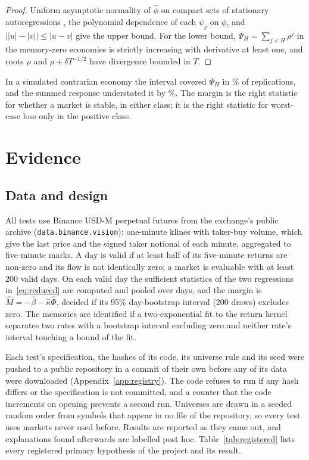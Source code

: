 \documentclass[12pt]{article}
\theoremstyle{definition}
\theoremstyle{remark}
\begin{document}
\begin{proof}
Uniform asymptotic normality of $\hat\phi$ on compact sets of stationary autoregressions \citep{mannwald1943,mikusheva2007}, the polynomial dependence of each $\psi_j$ on $\phi$, and $\big||u|-|v|\big|\le|u-v|$ give the upper bound. For the lower bound, $\Psi_H=\sum_{j<H}\rho^j$ in the memory-zero economies is strictly increasing with derivative at least one, and roots $\rho$ and $\rho+\delta T^{-1/2}$ have divergence bounded in $T$.
\end{proof}

In a simulated contrarian economy the interval covered $\Psi_H$ in \UniformCover\% of replications, and the summed response understated it by \UniformUnderstate\%. The margin is the right statistic for whether a market is stable, in either class; it is the right statistic for worst-case loss only in the positive class.

\section{Evidence}\label{sec:evidence}

\subsection{Data and design}

All tests use Binance USD-M perpetual futures from the exchange's public archive (\texttt{data.binance.vision}): one-minute klines with taker-buy volume, which give the last price and the signed taker notional of each minute, aggregated to five-minute marks. A day is valid if at least half of its five-minute returns are non-zero and its flow is not identically zero; a market is evaluable with at least 200 valid days. On each valid day the sufficient statistics of the two regressions in~\eqref{eq:reduced} are computed and pooled over days, and the margin is $\hat M=-\hat\beta-\hat\kappa\hat\Phi$, decided if its 95\% day-bootstrap interval (200 draws) excludes zero. The memories are identified if a two-exponential fit to the return kernel separates two rates with a bootstrap interval excluding zero and neither rate's interval touching a bound of the fit.

Each test's specification, the hashes of its code, its universe rule and its seed were pushed to a public repository in a commit of their own before any of its data were downloaded (Appendix~\ref{app:registry}). The code refuses to run if any hash differs or the specification is not committed, and a counter that the code increments on opening prevents a second run. Universes are drawn in a seeded random order from symbols that appear in no file of the repository, so every test uses markets never used before. Results are reported as they came out, and explanations found afterwards are labelled post hoc. Table~\ref{tab:registered} lists every registered primary hypothesis of the project and its result.
\end{document}
